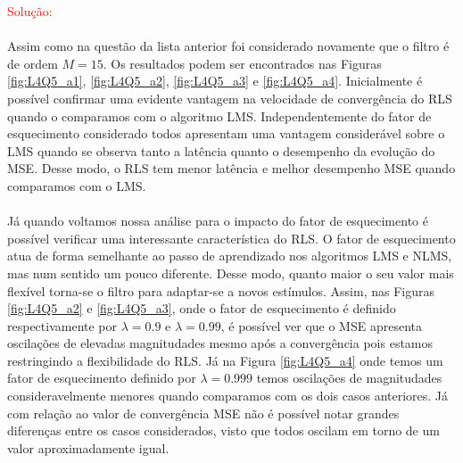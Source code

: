 \documentclass[a4paper,10pt]{article}
\begin{document}
\begin{enumerate}
				\textcolor{red}{Solução:}

				\paragraph{}Assim como na questão da lista anterior foi considerado novamente que o filtro é de ordem $M = 15$.
				Os resultados podem ser encontrados nas Figuras \ref{fig:L4Q5_a1}, \ref{fig:L4Q5_a2}, \ref{fig:L4Q5_a3} e \ref{fig:L4Q5_a4}.
				Inicialmente é possível confirmar uma evidente vantagem na velocidade de convergência do RLS quando o comparamos com o algoritmo LMS.
				Independentemente do fator de esquecimento considerado todos apresentam uma vantagem considerável sobre o LMS quando se observa tanto a 
				latência quanto o desempenho da evolução do MSE. Desse modo, o RLS tem menor latência e melhor desempenho MSE quando comparamos com o LMS.
				
				\paragraph{}Já quando voltamos nossa análise para o impacto do fator de esquecimento é possível verificar uma interessante característica do 
				RLS. O fator de esquecimento atua de forma semelhante ao passo de aprendizado nos algoritmos LMS e NLMS, mas num sentido um  pouco diferente. Desse modo, quanto
				maior o seu valor mais flexível torna-se o filtro para adaptar-se a novos estímulos. Assim, nas Figuras \ref{fig:L4Q5_a2} e \ref{fig:L4Q5_a3}, onde o 
				fator de esquecimento é definido respectivamente por $\lambda = 0.9$ e $\lambda = 0.99$, é possível ver que o MSE apresenta oscilações de 
				elevadas magnitudades mesmo após a convergência pois estamos restringindo a flexibilidade do RLS. Já na Figura \ref{fig:L4Q5_a4} onde temos um fator de esquecimento 
				definido por $\lambda = 0.999$ temos oscilações de magnitudades consideravelmente menores quando comparamos com os dois casos anteriores. Já com relação ao valor de convergência
				MSE não é possível notar grandes diferenças entre os casos considerados, visto que todos oscilam em torno de um valor aproximadamente igual.
			

\end{enumerate}
\end{document}
